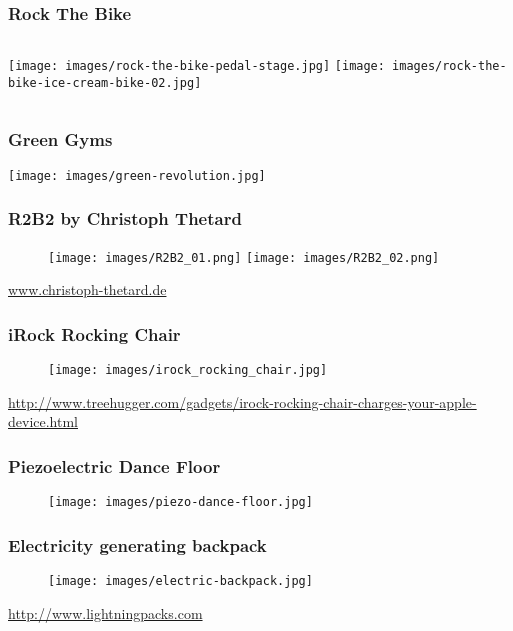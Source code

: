 \documentclass[]{beamer}
\begin{document}
%
\frame
{
	\frametitle{Rock The Bike}
	\begin{center}
		\begin{columns}[t]
			\column{5cm}
			\texttt{[image: images/rock-the-bike-pedal-stage.jpg]}
			\column{5cm}
			\texttt{[image: images/rock-the-bike-ice-cream-bike-02.jpg]}
		\end{columns}
	\end{center}
}
%
\frame
{
    \frametitle{Green Gyms}
    \begin{center}
				\texttt{[image: images/green-revolution.jpg]}
    \end{center}
}
%
\frame
{
    \frametitle{R2B2 by Christoph Thetard}
    \begin{center}
        \begin{figure}[]
            \texttt{[image: images/R2B2\_01.png]}
            \texttt{[image: images/R2B2\_02.png]}
        \end{figure}
        \url{www.christoph-thetard.de}
    \end{center}
}
%
\frame
{
    \frametitle{iRock Rocking Chair}
    \begin{center}
        \begin{figure}[]
            \texttt{[image: images/irock\_rocking\_chair.jpg]}
        \end{figure}
        \url{http://www.treehugger.com/gadgets/irock-rocking-chair-charges-your-apple-device.html}
    \end{center}
}
%
\frame
{
    \frametitle{Piezoelectric Dance Floor}
    \begin{center}
        \begin{figure}[]
            \texttt{[image: images/piezo-dance-floor.jpg]}
        \end{figure}
    \end{center}
}
%
\frame
{
    \frametitle{Electricity generating backpack}
    \begin{center}
        \begin{figure}[]
            \texttt{[image: images/electric-backpack.jpg]}
        \end{figure}
        \url{http://www.lightningpacks.com}
    \end{center}
}
%
\end{document}
